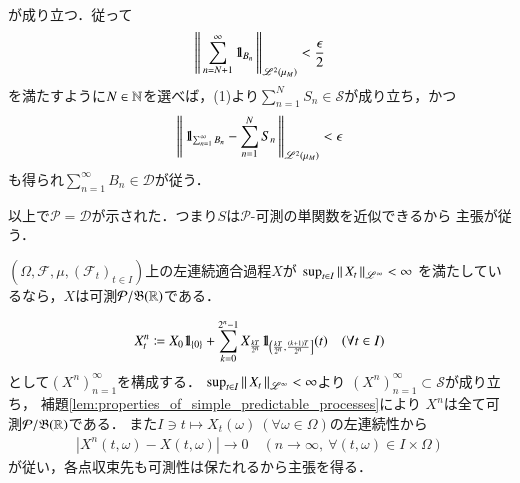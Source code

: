 \begin{prf}
\begin{description}
\begin{itemize}
\begin{align}
						\end{align}
						が成り立つ．従って
						\begin{align}
							\left\|\, \sum_{n=N+1}^{\infty}\mbox{1}\hspace{-0.25em}\mbox{l}_{B_n}\, \right\|_{\mathscr{L}^{2} \left(\mu_M\right)} < \frac{\epsilon}{2}
						\end{align}
						を満たすように$N \in \mathbb{N}$を選べば，(1)より$\sum_{n=1}^{N}S_n \in \mathcal{S}$が成り立ち，かつ
						\begin{align}
							\left\|\, \mbox{1}\hspace{-0.25em}\mbox{l}_{\sum_{n=1}^{\infty}B_n} - \sum_{n=1}^{N}S_n\, \right\|_{\mathscr{L}^{2} \left(\mu_M\right)} < \epsilon
						\end{align}
						も得られ$\sum_{n=1}^{\infty} B_n \in \mathcal{D}$が従う．
				\end{itemize}
				以上で$\mathcal{P} = \mathcal{D}$が示された．つまり$S$は$\mathcal{P}$-可測の単関数を近似できるから
				主張が従う．
				\QED
		\end{description}
	\end{prf}
	
	\begin{screen}
		\begin{thm}
			$(\Omega,\mathcal{F},\mu,(\mathcal{F}_t)_{t \in I})$上の左連続適合過程$X$が
			$\operatorname*{sup}_{t \in I} \left\|\, X_t\, \right\|_{\mathscr{L}^\infty} < \infty$
			を満たしているなら，$X$は可測$\mathcal{P}/\mathfrak{B}(\mathbb{R})$である．
			\label{thm:left_continuous_adapted_then_predictable}
		\end{thm}
	\end{screen}
	
	\begin{prf}
		\begin{align}
			X^n_t \coloneqq X_0 \mbox{1}\hspace{-0.25em}\mbox{l}_{\{0\}} + \sum_{k=0}^{2^n-1} X_{\frac{kT}{2^n}} \mbox{1}\hspace{-0.25em}\mbox{l}_{\left( \frac{kT}{2^n}, \frac{(k+1)T}{2^n}\right]}(t)
			\quad (\forall t \in I)
		\end{align}
		として$\left( X^n \right)_{n=1}^{\infty}$を構成する．
		$\operatorname*{sup}_{t \in I} \left\|\, X_t\, \right\|_{\mathscr{L}^\infty} < \infty$より
		$\left( X^n \right)_{n=1}^{\infty} \subset \mathcal{S}$が成り立ち，
		補題\ref{lem:properties_of_simple_predictable_processes}により
		$X^n$は全て可測$\mathcal{P}/\mathfrak{B}(\mathbb{R})$である．
		また$I \ni t \longmapsto X_t(\omega)\ (\forall \omega \in \Omega)$の左連続性から
		\begin{align}
			\left| X^n(t,\omega) - X(t,\omega) \right| \longrightarrow 0
			\quad (n \longrightarrow \infty,\ \forall (t,\omega) \in I \times \Omega)
		\end{align}
		が従い，各点収束先も可測性は保たれるから主張を得る．
		\QED
	\end{prf}
	